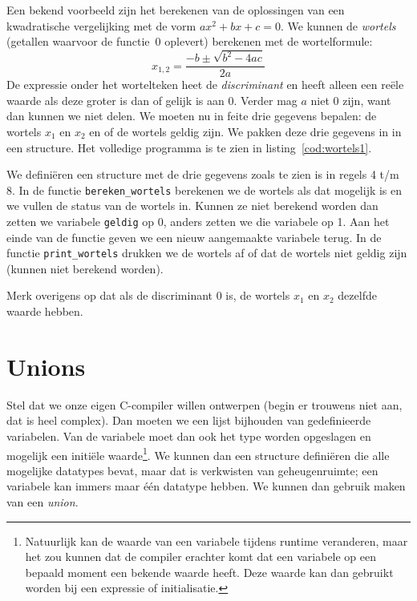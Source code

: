 Een bekend voorbeeld zijn het berekenen van de oplossingen van een kwadratische vergelijking met de vorm $ax^2+bx+c=0$. We kunnen de \textsl{wortels} (getallen waarvoor de functie~0 oplevert) berekenen met de wortelformule:
%
\begin{equation}
x_{1,2} = \dfrac{-b\pm\sqrt{b^2-4ac}}{2a}
\end{equation}
%
De expressie onder het wortelteken heet de \textsl{discriminant} en heeft alleen een reële waarde als deze groter is dan of gelijk is aan 0. Verder mag $a$ niet 0 zijn, want dan kunnen we niet delen. We moeten nu in feite drie gegevens bepalen: de wortels $x_1$ en $x_2$ en of de wortels geldig zijn. We pakken deze drie gegevens in in een structure. Het volledige programma is te zien in listing~\ref{cod:wortels1}.

We definiëren een structure met de drie gegevens zoals te zien is in regels 4 t/m 8. In de functie \texttt{bereken\_wortels} berekenen we de wortels als dat mogelijk is en we vullen de status van de wortels in. Kunnen ze niet berekend worden dan zetten we variabele \texttt{geldig} op 0, anders zetten we die variabele op 1. Aan het einde van de functie geven we een nieuw aangemaakte variabele terug. In de functie \texttt{print\_wortels} drukken we de wortels af of dat de wortels niet geldig zijn (kunnen niet berekend worden).


Merk overigens op dat als de discriminant 0 is, de wortels $x_1$ en $x_2$ dezelfde waarde hebben.

\advanced
\section{Unions}
Stel dat we onze eigen C-compiler willen ontwerpen (begin er trouwens niet aan, dat is heel complex). Dan moeten we een lijst bijhouden van gedefinieerde variabelen. Van de variabele moet dan ook het type worden opgeslagen en mogelijk een initiële waarde\footnote{Natuurlijk kan de waarde van een variabele tijdens runtime veranderen, maar het zou kunnen dat de compiler erachter komt dat een variabele op een bepaald moment een bekende waarde heeft. Deze waarde kan dan gebruikt worden bij een expressie of initialisatie.}. We kunnen dan een structure definiëren die alle mogelijke datatypes bevat, maar dat is verkwisten van geheugenruimte; een variabele kan immers maar één datatype hebben. We kunnen dan gebruik maken van een \textsl{union}.

